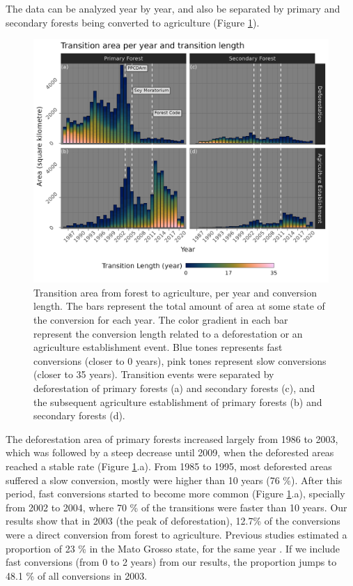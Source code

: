 \documentclass[essd, manuscript]{copernicus}
\begin{document}
The data can be analyzed year by year, and also be separated by primary and secondary forests being converted to agriculture (Figure \ref{fig:transbar-plot}).

\begin{figure}[h]
\includegraphics[width=17cm]{figs/trans_length_cols} \caption{Transition area from forest to agriculture, per year and conversion length. The bars represent the total amount of area at some state of the conversion for each year. The color gradient in each bar represent the conversion length related to a deforestation or an agriculture establishment event. Blue tones represents fast conversions (closer to 0 years), pink tones represent slow conversions (closer to 35 years). Transition events were separated by deforestation of primary forests (a) and secondary forests (c), and the subsequent agriculture establishment of primary forests (b) and secondary forests (d).}\label{fig:transbar-plot}
\end{figure}

The deforestation area of primary forests increased largely from 1986 to 2003, which was followed by a steep decrease until 2009, when the deforested areas reached a stable rate (Figure \ref{fig:transbar-plot}.a).
From 1985 to 1995, most deforested areas suffered a slow conversion, mostly were higher than 10 years (76 \%).
After this period, fast conversions started to become more common (Figure \ref{fig:transbar-plot}.a), specially from 2002 to 2004, where 70 \% of the transitions were faster than 10 years.
Our results show that in 2003 (the peak of deforestation), 12.7\% of the conversions were a direct conversion from forest to agriculture.
Previous studies estimated a proportion of 23 \% in the Mato Grosso state, for the same year \citep{Morton2006}.
If we include fast conversions (from 0 to 2 years) from our results, the proportion jumps to 48.1 \% of all conversions in 2003.
\end{document}
